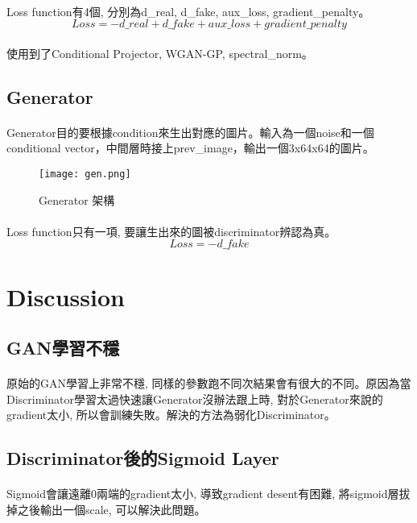 \paragraph{}
Loss function有4個, 分別為d\_real, d\_fake, aux\_loss, gradient\_penalty。
$$Loss = - d\_real + d\_fake + aux\_loss + gradient\_penalty$$
\paragraph{}
使用到了Conditional Projector, WGAN-GP, spectral\_norm。
\newpage
\subsection{Generator}
\paragraph{}
Generator目的要根據condition來生出對應的圖片。輸入為一個noise和一個conditional vector，中間層時接上prev\_image，輸出一個3x64x64的圖片。
\begin{figure}[!ht]
    \begin{center} 
        \texttt{[image: gen.png]}
        \caption{Generator 架構}
    \end{center} 
\end{figure}
\paragraph{}
Loss function只有一項, 要讓生出來的圖被discriminator辨認為真。
$$Loss = -d\_fake $$
\section{Discussion}
\subsection{GAN學習不穩}
\paragraph{}
原始的GAN學習上非常不穩, 同樣的參數跑不同次結果會有很大的不同。原因為當Discriminator學習太過快速讓Generator沒辦法跟上時, 對於Generator來說的gradient太小, 所以會訓練失敗。解決的方法為弱化Discriminator。
\subsection{Discriminator後的Sigmoid Layer}
\paragraph{}
Sigmoid會讓遠離0兩端的gradient太小, 導致gradient desent有困難, 將sigmoid層拔掉之後輸出一個scale, 可以解決此問題。
